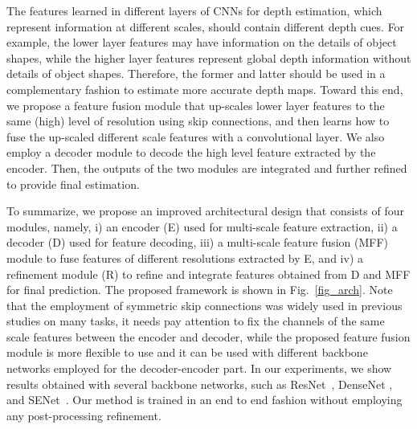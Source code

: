 \documentclass[10pt,twocolumn,letterpaper]{article}
\begin{document}
The features learned in different layers of CNNs for depth estimation, which represent information at different scales, should contain different depth cues. For example, the lower layer features may have information on 
the details of object shapes, while the higher layer features represent global depth information without details of object shapes. 
Therefore, 
the former and latter should be used in a complementary fashion to estimate more accurate depth maps. 
Toward this end, we propose a feature fusion module that up-scales lower layer features to the same (high) level of resolution using skip connections, and then learns how to fuse the up-scaled different scale features with a convolutional layer. 
We also employ a decoder module to decode the high level feature extracted by the encoder.
Then, the outputs of the two modules are integrated and further refined to provide final estimation. 

To summarize, we propose an improved architectural design that consists of four modules, namely, i) an encoder (E) used for multi-scale feature extraction, ii) a decoder (D) used for feature decoding, iii) a multi-scale feature fusion (MFF) module to fuse features of different resolutions extracted by E, and iv) a refinement module (R) to refine and integrate features obtained from D and MFF for final prediction. The proposed framework is shown in Fig.~\ref{fig_arch}.
Note that the employment of symmetric skip connections was widely used in previous studies on many tasks, it needs pay attention to fix the channels of the same scale features between the encoder and decoder, while the proposed feature fusion module is more flexible to use and it can be used with different backbone networks employed for the decoder-encoder part.
In our experiments, we show results obtained with several backbone networks, such as ResNet~\cite{he2016deep}, DenseNet \cite{huang2016densely}, and SENet~\cite{hu2018senet}. 
Our method is trained in an end to end fashion without employing any post-processing refinement. 

\begin{figure*}[t]
\centering
{}
\caption{A diagram of the proposed network architecture. Given an input image, the encoder (E) extracts multi-scale features (1/4, 1/8, 1/16, and 1/32). The decoder (D) converts the last 1/32 scale feature to get a 1/2 scale feature. Each of the multi-scale features is up-scaled to 1/2 scale, and fused by the multi-scale feature fusion module (MFF). The outputs of D and MFF and are refined by the refinement module (R) to obtain the final depth map. Each box named ``block$n$'' denotes a block of multiple convolutional layers, such as residual block of ResNet;
each box named ``up$n$'' denotes a up-projection layer introduced in \cite{laina2016deeper}. Batch normalization and ReLU nonlinearity are applied to the output of each convolutional layer except conv6.} 
\label{fig_arch}
\end{figure*}
\end{document}
